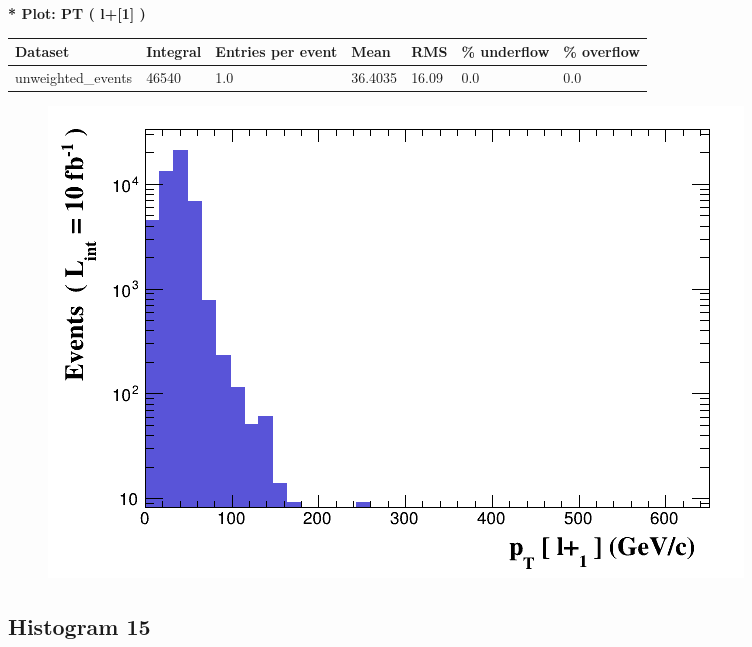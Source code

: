 \documentclass[a4paper, 10pt]{article}
\begin{document}
\textbf{* Plot: PT ( l+[1] ) }\\
   \begin{table}[H]
  \begin{center}
    \begin{tabular}{|m{23.0mm}|m{23.0mm}|m{18.0mm}|m{19.0mm}|m{19.0mm}|m{19.0mm}|m{19.0mm}|}
      \hline
      {\cellcolor{yellow}         Dataset}& {\cellcolor{yellow}         Integral}& {\cellcolor{yellow}         Entries per event}& {\cellcolor{yellow}         Mean}& {\cellcolor{yellow}         RMS}& {\cellcolor{yellow}         \% underflow}& {\cellcolor{yellow}         \% overflow}\\
      \hline
      {\cellcolor{white}         unweighted\_events}& {\cellcolor{white}         46540}& {\cellcolor{white}         1.0}& {\cellcolor{white}         36.4035}& {\cellcolor{white}         16.09}& {\cellcolor{green}         0.0}& {\cellcolor{green}         0.0}\\
\hline
    \end{tabular}
  \end{center}
\end{table}

\begin{figure}[H]
  \begin{center}
    \includegraphics[scale=0.45]{selection_13.png}\\
\caption{   }
  \end{center}
\end{figure}
      \newpage
\subsection{ Histogram 15}
\end{document}
